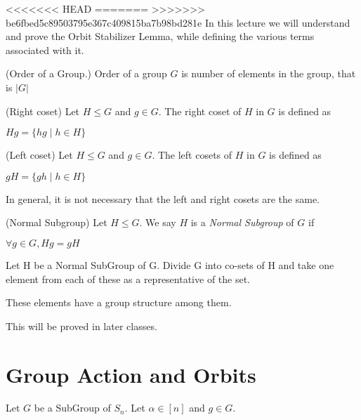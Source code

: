 <<<<<<< HEAD
=======
>>>>>>> be6fbed5c89503795e367c409815ba7b98bd281e
In this lecture we will understand and prove the Orbit Stabilizer Lemma, while defining the various terms associated with it.


\begin{definition}(Order of a Group.) Order of a group $G$ is number of elements in the group, that is $|G|$ \end{definition}

\begin{definition}(Right coset) Let $H \le G$ and $g \in G$. The right coset of $H$ in $G$ is defined as 
\begin{center}
$Hg = \{hg \mid h \in H\}$
\end{center}
 \end{definition}

\begin{definition}(Left coset) Let $H \le G$ and $g \in G$. The left cosets of $H$ in $G$ is defined as 
\begin{center}
$gH = \{gh \mid h \in H\}$
\end{center}
\end{definition}

\begin{note}
In general, it is not necessary that the left and right cosets are the same.
\end{note}

\begin{definition}(Normal Subgroup)
Let $H \le G$. We say $H$ is a {\em Normal Subgroup} of $G$ if
\begin{center}
$\forall g \in G, Hg= gH$
\end{center}
\end{definition}

Let H be a Normal SubGroup of G. Divide G into co-sets of H and take one element from each of these as a representative of the set.
\begin{claim} These elements have a group structure among them. \end{claim}
This will be proved in later classes.

\section{Group Action and Orbits}
Let $G$ be a SubGroup of $S_n$. Let $\alpha \in [n]$ and $g \in G$.

